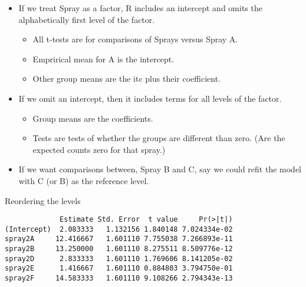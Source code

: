 \documentclass[12pt,openright,oneside,a4paper,chapter=TITLE,section=TITLE,subsection=Title,english,french,spanish,portugues,sumario=tradicional]{04-class-files/abntex2}
\newenvironment{Shaded}{\begin{snugshade}}{\end{snugshade}}
\newcommand{\DataTypeTok}[1]{\textcolor[rgb]{0.13,0.29,0.53}{#1}}
\newcommand{\KeywordTok}[1]{\textcolor[rgb]{0.13,0.29,0.53}{\textbf{#1}}}
\newcommand{\NormalTok}[1]{#1}
\newcommand{\OperatorTok}[1]{\textcolor[rgb]{0.81,0.36,0.00}{\textbf{#1}}}
\newcommand{\StringTok}[1]{\textcolor[rgb]{0.31,0.60,0.02}{#1}}
\providecommand{\tightlist}{%
  \setlength{\itemsep}{0pt}\setlength{\parskip}{0pt}}
\begin{document}
\begin{itemize}
\tightlist
\item
  If we treat Spray as a factor, R includes an intercept and omits the alphabetically first level of the factor.

  \begin{itemize}
  \tightlist
  \item
    All t-tests are for comparisons of Sprays versus Spray A.
  \item
    Emprirical mean for A is the intercept.
  \item
    Other group means are the itc plus their coefficient.
  \end{itemize}
\item
  If we omit an intercept, then it includes terms for all levels of the factor.

  \begin{itemize}
  \tightlist
  \item
    Group means are the coefficients.
  \item
    Tests are tests of whether the groups are different than zero. (Are the expected counts zero for that spray.)
  \end{itemize}
\item
  If we want comparisons between, Spray B and C, say we could refit the model with C (or B) as the reference level.
\end{itemize}

Reordering the levels

\begin{Shaded}
\end{Shaded}

\begin{verbatim}
             Estimate Std. Error  t value     Pr(>|t|)
(Intercept)  2.083333   1.132156 1.840148 7.024334e-02
spray2A     12.416667   1.601110 7.755038 7.266893e-11
spray2B     13.250000   1.601110 8.275511 8.509776e-12
spray2D      2.833333   1.601110 1.769606 8.141205e-02
spray2E      1.416667   1.601110 0.884803 3.794750e-01
spray2F     14.583333   1.601110 9.108266 2.794343e-13
\end{verbatim}
\end{document}
